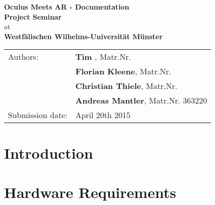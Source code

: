 



	\begin{center}
		\vspace*{54mm}
		{
			\renewcommand{\baselinestretch}{0.9}\normalsize
			\Large
			\textbf{Oculus Meets AR - Documentation}\\
		}
		\vspace*{15.5mm}
		{
			\large
			\textbf{Project Seminar}\\
		}
		\vspace*{10mm}
		{
			at\\
			\textbf{Westfälischen Wilhelms-Universität Münster}\\
		}
		\vspace*{100mm}
		\begin{tabular*}{137mm}{ll}
			Authors: 		& \textbf{Tim }, Matr.Nr. \\
						& \textbf{Florian Kleene}, Matr.Nr. \\
						& \textbf{Christian Thiele}, Matr.Nr. \\
						& \textbf{Andreas Mantler}, Matr.Nr. 363220\\
			Submission date: 	& April 20th 2015
		\end{tabular*}
	\end{center}
	\newpage
	
	\thispagestyle{empty}\quad\newpage
	
	\thispagestyle{empty}
	\tableofcontents
	\vfill
	\newpage

	\thispagestyle{empty}\quad\newpage
	
	\setcounter{page}{1}
	\pagestyle{scrheadings}
	\setfootsepline{0pt} 
	\ihead[\chaptername\ \thechapter: \leftmark]{\chaptername\ \thechapter: \leftmark}
	\cfoot[\vspace*{9mm}\pagemark]{\vspace*{9mm}\pagemark}
	\renewcommand{\baselinestretch}{1.3}\normalsize

	\chapter{Introduction}
	\label{sec:introduction}
		

	\chapter{Hardware Requirements}
	\label{sec:hardware_requirements}
		
	
	


	


